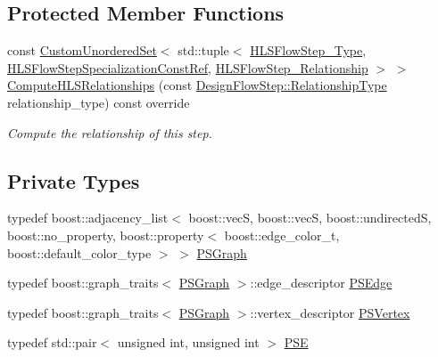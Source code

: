 \subsection*{Protected Member Functions}
\begin{DoxyCompactItemize}
\item 
const \hyperlink{classCustomUnorderedSet}{Custom\+Unordered\+Set}$<$ std\+::tuple$<$ \hyperlink{hls__step_8hpp_ada16bc22905016180e26fc7e39537f8d}{H\+L\+S\+Flow\+Step\+\_\+\+Type}, \hyperlink{hls__step_8hpp_a5fdd2edf290c196531d21d68e13f0e74}{H\+L\+S\+Flow\+Step\+Specialization\+Const\+Ref}, \hyperlink{hls__step_8hpp_a3ad360b9b11e6bf0683d5562a0ceb169}{H\+L\+S\+Flow\+Step\+\_\+\+Relationship} $>$ $>$ \hyperlink{classport__swapping_a5749b47ab0a486ca886beda910015b9e}{Compute\+H\+L\+S\+Relationships} (const \hyperlink{classDesignFlowStep_a723a3baf19ff2ceb77bc13e099d0b1b7}{Design\+Flow\+Step\+::\+Relationship\+Type} relationship\+\_\+type) const override
\begin{DoxyCompactList}\small\item\em Compute the relationship of this step. \end{DoxyCompactList}\end{DoxyCompactItemize}
\subsection*{Private Types}
\begin{DoxyCompactItemize}
\item 
typedef boost\+::adjacency\+\_\+list$<$ boost\+::vecS, boost\+::vecS, boost\+::undirectedS, boost\+::no\+\_\+property, boost\+::property$<$ boost\+::edge\+\_\+color\+\_\+t, boost\+::default\+\_\+color\+\_\+type $>$ $>$ \hyperlink{classport__swapping_a77c6a219f0b86bd9340d8354e3fff755}{P\+S\+Graph}
\item 
typedef boost\+::graph\+\_\+traits$<$ \hyperlink{classport__swapping_a77c6a219f0b86bd9340d8354e3fff755}{P\+S\+Graph} $>$\+::edge\+\_\+descriptor \hyperlink{classport__swapping_a76aac644bf41ee5d794ab40f5b8af6a4}{P\+S\+Edge}
\item 
typedef boost\+::graph\+\_\+traits$<$ \hyperlink{classport__swapping_a77c6a219f0b86bd9340d8354e3fff755}{P\+S\+Graph} $>$\+::vertex\+\_\+descriptor \hyperlink{classport__swapping_a9588366dd46f9f32aab2c8de93d5679f}{P\+S\+Vertex}
\item 
typedef std\+::pair$<$ unsigned int, unsigned int $>$ \hyperlink{classport__swapping_ac98b23b7c2dd3f3792327fb666489d66}{P\+SE}
\end{DoxyCompactItemize}
